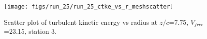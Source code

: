 \begin{figure}[H]
\centering
\texttt{[image: figs/run\_25/run\_25\_ctke\_vs\_r\_meshscatter]}
\caption{Scatter plot of turbulent kinetic energy vs radius at $z/c$=7.75, $V_{free}$=23.15, station 3.}
\label{fig:run_25_ctke_vs_r_meshscatter}
\end{figure}


